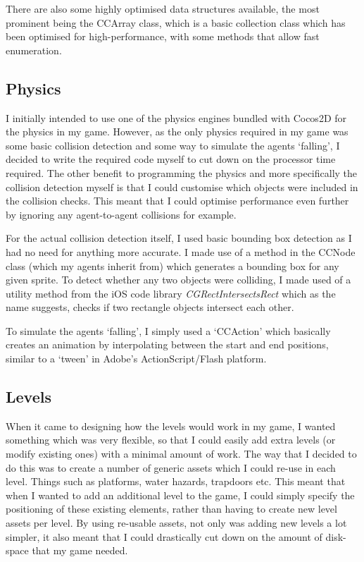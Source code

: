 \documentclass[a4paper,oneside]{report}
\begin{document}
There are also some highly optimised data structures available, the most prominent being the CCArray class, which is a basic collection class which has been optimised for high-performance, with some methods that allow fast enumeration.

\subsection{Physics}

I initially intended to use one of the physics engines bundled with Cocos2D for the physics in my game. However, as the only physics required in my game was some basic collision detection and some way to simulate the agents `falling', I decided to write the required code myself to cut down on the processor time required. The other benefit to programming the physics and more specifically the collision detection myself is that I could customise which objects were included in the collision checks. This meant that I could optimise performance even further by ignoring any agent-to-agent collisions for example.

For the actual collision detection itself, I used basic bounding box detection as I had no need for anything more accurate. I made use of a method in the CCNode class (which my agents inherit from) which generates a bounding box for any given sprite. To detect whether any two objects were colliding, I made used of a utility method from the iOS code library \emph{CGRectIntersectsRect} which as the name suggests, checks if two rectangle objects intersect each other.

To simulate the agents `falling', I simply used a `CCAction' which basically creates an animation by interpolating between the start and end positions, similar to a `tween' in Adobe's ActionScript/Flash platform. 

\subsection{Levels} 

When it came to designing how the levels would work in my game, I wanted something which was very flexible, so that I could easily add extra levels (or modify existing ones) with a minimal amount of work. The way that I decided to do this was to create a number of generic assets which I could re-use in each level. Things such as platforms, water hazards, trapdoors etc. This meant that when I wanted to add an additional level to the game, I could simply specify the positioning of these existing elements, rather than having to create new level assets per level. By using re-usable assets, not only was adding new levels a lot simpler, it also meant that I could drastically cut down on the amount of disk-space that my game needed.
\end{document}
